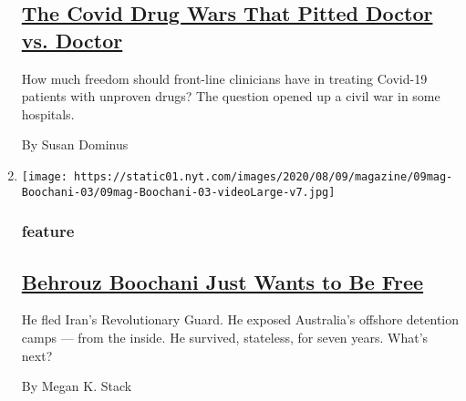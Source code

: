 \begin{enumerate}
{  \subsection{\texorpdfstring{\href{/2020/08/05/magazine/covid-drug-wars-doctors.html}{The
  Covid Drug Wars That Pitted Doctor vs.
  Doctor}}{The Covid Drug Wars That Pitted Doctor vs. Doctor}}\label{the-covid-drug-wars-that-pitted-doctor-vs-doctor}}

  How much freedom should front-line clinicians have in treating
  Covid-19 patients with unproven drugs? The question opened up a civil
  war in some hospitals.

  By Susan Dominus
\item
  \texttt{[image: https://static01.nyt.com/images/2020/08/09/magazine/09mag-Boochani-03/09mag-Boochani-03-videoLarge-v7.jpg]}

  \hypertarget{feature-1}{%
  \subsubsection{feature}\label{feature-1}}

  \hypertarget{behrouz-boochani-just-wants-to-be-free}{%
  \subsection{\texorpdfstring{\href{/2020/08/04/magazine/behrouz-boochani-australia.html}{Behrouz
  Boochani Just Wants to Be
  Free}}{Behrouz Boochani Just Wants to Be Free}}\label{behrouz-boochani-just-wants-to-be-free}}

  He fled Iran's Revolutionary Guard. He exposed Australia's offshore
  detention camps --- from the inside. He survived, stateless, for seven
  years. What's next?

  By Megan K. Stack
\end{enumerate}

